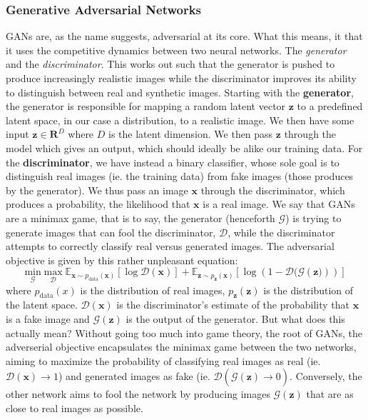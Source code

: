 \documentclass{article}
\begin{document}
\subsubsection{Generative Adversarial Networks}
GANs are, as the name suggests, adversarial at its core. What this means, it that it uses the competitive dynamics between two neural networks. The \emph{generator} and the \emph{discriminator}. This works out such that the generator is pushed to produce increasingly realistic images while the discriminator improves its ability to distinguish between real and synthetic images.\newline
Starting with the \textbf{generator}, the generator is responsible for mapping a random latent vector $\mathbf{z}$ to a predefined latent space, in our case a distribution, to a realistic image. We then have some input $\mathbf{z} \in \mathbf{R}^D$ where $D$ is the latent dimension. We then pass $\mathbf{z}$ through the model which gives an output, which should ideally be alike our training data.
\newline
For the \textbf{discriminator}, we have instead a binary classifier, whose sole goal is to distinguish real images (ie. the training data) from fake images (those produces by the generator). We thus pass an image $\mathbf{x}$ through the discriminator, which produces a probability, the likelihood that $\mathbf{x}$ is a real image.
\newline
We say that GANs are a minimax game, that is to say, the generator (henceforth $\mathcal{G}$) is trying to generate images that can fool the discriminator, $\mathcal{D}$, while the discriminator attempts to correctly classify real versus generated images. The adversarial objective is given by this rather unpleasant equation:
\begin{equation}
    \underset{\mathcal{G}}{\text{min}} \; \underset{\mathcal{D}}{\text{max}} \;\mathbb{E}_{\mathbf{x} \sim p_{\text{data}}(\mathbf{x})} \left[ \log \mathcal{D} (\mathbf{x}) \right] + \mathbb{E}_{\mathbf{z} \sim p_{\mathbf{z}}(\mathbf{x})} \left[\log\left(1 - \mathcal{D} (\mathcal{G}(\mathbf{z)})    \right) \right]
\end{equation}
where $p_{\text{data}}(x)$ is the distribution of real images, $p_{\mathbf{z}}(\mathbf{z})$ is the distribution of the latent space. $\mathcal{D}(\mathbf{x})$ is the discriminator's estimate of the probability that $\mathbf{x}$ is a fake image and $\mathcal{G}(\mathbf{z})$ is the output of the generator. \newline
But what does this actually mean? Without going too much into game theory, the root of GANs, the adverserial objective encapsulates the minimax game between the two networks, aiming to maximize the probability of classifying real images as real (ie. $\mathcal{D}(\mathbf{x}) \xrightarrow[]{} 1$) and generated images as fake (ie. $\mathcal{D}(\mathcal{G}(\mathbf{z}) \xrightarrow[]{} 0)$. Conversely, the other network aims to fool the network by producing images $\mathcal{G}(\mathbf{z})$ that are as close to real images as possible. \newline
\end{document}
